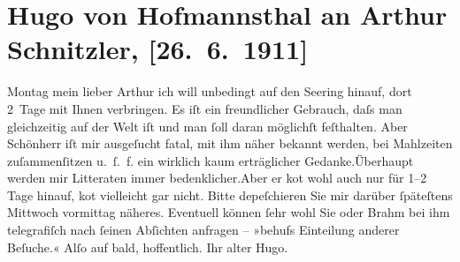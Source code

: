 

         
         \renewcommand{\erwaehntePersonen}{Personen: Otto Brahm, Karl Schönherr}
         \renewcommand{\erwaehnteOrte}{Orte: Semmering, Wien}
         \renewcommand{\erwaehnteWerke}{}
               \section[Hugo von Hofmannsthal an Arthur Schnitzler, {[}26. 6. 1911{]}]{ Hugo von Hofmannsthal an Arthur Schnitzler, {[}26. 6. 1911{]}}\nopagebreak{}\rehead{ }\begin{ledgroupsized}[t]{13cm}\normalsize\beginnumbering \toendnotes[C]{\smallbreak\pagebreak[2]} 
\pstart
           \raggedleft{}{\pb}Montag\pend
           \pstart{}mein lieber Arthur\pend\pstart
           ich will unbedingt auf den Se{\geminationm}ering hinauf, dort 2 Tage mit Ihnen verbringen. Es iſt ein
               freundlicher Gebrauch, daſs man gleichzeitig auf der Welt iſt und man ſoll daran
               möglichſt feſthalten.\pend
           \pstart
           Aber Schönherr iſt mir ausgeſucht fatal, mit ihm
               näher bekannt werden, bei Mahlzeiten {\pb}zuſammenſitzen u. ſ. f. ein
                  wirklich kaum erträglicher Gedanke.\hspace*{1.5em}Überhaupt werden mir Litteraten immer
                  bedenklicher.\hspace*{1.5em}Aber er ko{\geminationm}t wohl auch nur für 1–2 Tage hinauf, ko{\geminationm}t vielleicht gar nicht. Bitte depeſchieren Sie mir
               darüber ſpäteſtens Mittwoch vormittag näheres. Eventuell können ſehr
               wohl Sie oder Brahm bei ihm telegrafiſch nach
               ſeinen Abſichten anfragen – »behufs Einteilung anderer Beſuche.« \pend
           \pstart
           Alſo auf bald, hoffentlich. Ihr alter \spacefill\mbox{Hugo.}\pend
           
         
         \endnumbering{}\end{ledgroupsized}  \newcommand{\dateiname}{L02024}\newcommand{\titel}{Hugo von Hofmannsthal an Arthur Schnitzler, [26. 6. 1911]}\newcommand{\editorInnen}{Martin Anton Müller und Gerd-Hermann Susen}
      